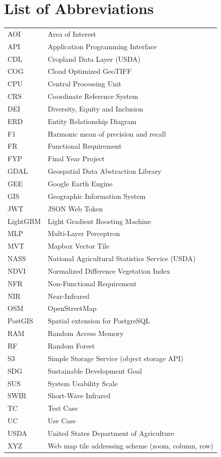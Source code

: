 \chapter*{List of Abbreviations}
\thispagestyle{plain}
\begin{longtable}{@{}ll@{}}
AOI & Area of Interest\\
API & Application Programming Interface\\
CDL & Cropland Data Layer (USDA)\\
COG & Cloud Optimized GeoTIFF\\
CPU & Central Processing Unit\\
CRS & Coordinate Reference System\\
DEI & Diversity, Equity and Inclusion\\
ERD & Entity Relationship Diagram\\
F1 & Harmonic mean of precision and recall\\
FR & Functional Requirement\\
FYP & Final Year Project\\
GDAL & Geospatial Data Abstraction Library\\
GEE & Google Earth Engine\\
GIS & Geographic Information System\\
JWT & JSON Web Token\\
LightGBM & Light Gradient Boosting Machine\\
MLP & Multi-Layer Perceptron\\
MVT & Mapbox Vector Tile\\
NASS & National Agricultural Statistics Service (USDA)\\
NDVI & Normalized Difference Vegetation Index\\
NFR & Non-Functional Requirement\\
NIR & Near-Infrared\\
OSM & OpenStreetMap\\
PostGIS & Spatial extension for PostgreSQL\\
RAM & Random Access Memory\\
RF & Random Forest\\
S3 & Simple Storage Service (object storage API)\\
SDG & Sustainable Development Goal\\
SUS & System Usability Scale\\
SWIR & Short-Wave Infrared\\
TC & Test Case\\
UC & Use Case\\
USDA & United States Department of Agriculture\\
XYZ & Web map tile addressing scheme (zoom, column, row)\\
\end{longtable}
